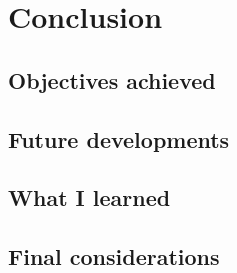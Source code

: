 \chapter{Conclusion}
\label{cap:conclusion}

\section{Objectives achieved}

\section{Future developments}

\section{What I learned}

\section{Final considerations}
